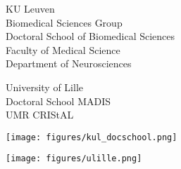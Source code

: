 \begin{titlepage}
    \sffamily
    \begin{minipage}[t]{.5\textwidth}
    \vspace{0pt}
    KU Leuven \\
    Biomedical Sciences Group \\
    Doctoral School of Biomedical Sciences \\
    Faculty of Medical Science \\
    Department of Neurosciences
    \bigskip

    University of Lille \\
    Doctoral School MADIS \\
    UMR CRIStAL \\

    \end{minipage}\hfill%
    \begin{minipage}[t]{.3\textwidth}
      \vspace{0pt}
      \texttt{[image: figures/kul\_docschool.png]}
      \smallskip

      \texttt{[image: figures/ulille.png]}
    \end{minipage}

    \vfill

    \noindent{}


\end{titlepage}
